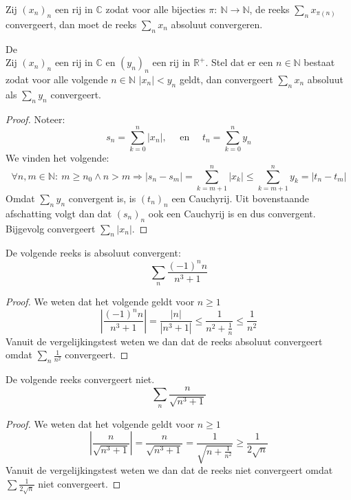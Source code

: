 \documentclass[main.tex]{subfiles}
\begin{document}
\begin{st}
  Zij $(x_{n})_{n}$ een rij in $\mathbb{C}$ zodat voor alle bijecties $\pi:\ \mathbb{N} \rightarrow \mathbb{N}$, de reeks $\sum_{n}x_{\pi(n)}$ convergeert, dan moet de reeks $\sum_{n}x_{n}$ absoluut convergeren.
\end{st}

\begin{bst}
  \label{st:vergelijkingstest}
  De \\
  Zij $(x_{n})_{n}$ een rij in $\mathbb{C}$ en $(y_{n})_{n}$ een rij in $\mathbb{R}^{+}$.
  Stel dat er een $n\in \mathbb{N}$ bestaat zodat voor alle volgende $n\in \mathbb{N}$ $|x_{n}| < y_{n}$ geldt, dan convergeert $\sum_{n}x_{n}$ absoluut als $\sum_{n}y_{n}$ convergeert.

  \begin{proof}
    Noteer:
    \[ 
    s_{n} = \sum_{k=0}^{n}|x_{n}|,\quad
    \text{ en }\quad
    t_{n} = \sum_{k=0}^{n}y_{n}
    \]
    We vinden het volgende:
    \[ \forall n,m\in \mathbb{N}:\ m \ge n_{0} \wedge n > m \Rightarrow |s_{n}-s_{m}| = \sum_{k=m+1}^{n}|x_{k}| \le \sum_{k=m+1}^{n}y_{k} = |t_{n}-t_{m}| \]
    Omdat $\sum_{n}y_{n}$ convergent is, is $(t_{n})_{n}$ een Cauchyrij.
    Uit bovenstaande afschatting volgt dan dat $(s_{n})_{n}$ ook een Cauchyrij is en dus convergent.
    Bijgevolg convergeert $\sum_{n}|x_{n}|$.
  \end{proof}
\end{bst}

\begin{vb}
  De volgende reeks is absoluut convergent:
  \[ \sum_{n}\frac{(-1)^{n}n}{n^{3}+1} \]
  
  \begin{proof}
    We weten dat het volgende geldt voor $n\ge 1$
    \[
    \left| \frac{(-1)^{n}n}{n^{3}+1} \right|
    = \frac{|n|}{|n^{3}+1|}
    \le \frac{1}{n^{2}+ \frac{1}{n}}
    \le \frac{1}{n^{2}} \]
    Vanuit de vergelijkingstest weten we dan dat de reeks absoluut convergeert omdat $\sum_{n}\frac{1}{n^{2}}$ convergeert.
  \end{proof}
\end{vb}

\begin{vb}
  De volgende reeks convergeert niet.
  \[ \sum_{n}\frac{n}{\sqrt{n^{3}+1}} \]

  \begin{proof}
    We weten dat het volgende geldt voor $n\ge 1$
    \[
    \left| \frac{n}{\sqrt{n^{3}+1}}\right|
    = \frac{n}{\sqrt{n^{3}+1}}
    = \frac{1}{\sqrt{n + \frac{1}{n^{2}}}}
    \ge \frac{1}{2\sqrt{n}}
    \]
    Vanuit de vergelijkingstest weten we dan dat de reeks niet convergeert omdat $\sum\frac{1}{2\sqrt{n}}$ niet convergeert.
  \end{proof}
\end{vb}
\end{document}
